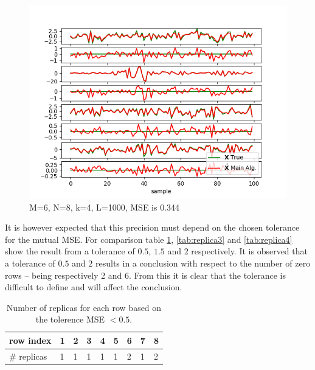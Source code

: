 \begin{figure}[H]
	\centering
	\includegraphics[scale=0.5]{figures/ch_estimate/k_test3.png}
	\caption{M=6, N=8, k=4, L=1000, MSE is 0.344}
	\label{fig:ktest3}
\end{figure}
\noindent
It is however expected that this precision must depend on the chosen tolerance for the mutual MSE. For comparison table \ref{tab:replica2}, \ref{tab:replica3} and \ref{tab:replica4} show the result from a tolerance of $0.5$, $1.5$ and $2$ respectively. 
It is observed that a tolerance of $0.5$ and $2$ results in a conclusion with respect to the number of zero rows -- being respectively 2 and 6. From this it is clear that the tolerance is difficult to define and will affect the conclusion.  
\begin{table}[H]
\center
\begin{tabular}{|l|l|l|l|l|l|l|l|l|}
\hline
row index   & 1 & 2 & 3 & 4 & 5 & 6 & 7 & 8 \\ \hline
\# replicas & 1 & 1 & 1 & 1 & 1 & 2 & 1 & 2 \\ \hline
\end{tabular}
\caption{Number of replicas for each row based on the tolerence MSE $< 0.5$.}
\label{tab:replica2}
\end{table}
\noindent

